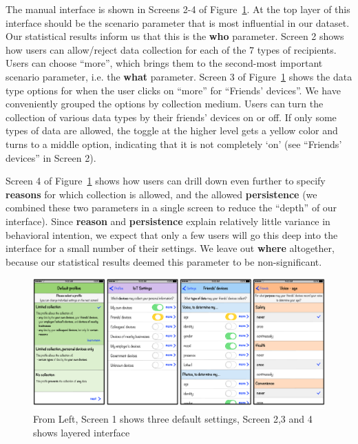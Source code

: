 The manual interface is shown in Screens 2-4 of Figure~\ref{fig:interface1}. At the top layer of this interface should be the scenario parameter that is most influential in our dataset. Our statistical results inform us that this is the \textbf{who} parameter. Screen 2 shows how users can allow/reject data collection for each of the 7 types of recipients. Users can choose ``more'', which brings them to the second-most important scenario parameter, i.e. the \textbf{what} parameter. Screen 3 of Figure~\ref{fig:interface1} shows the data type options for when the user clicks on ``more'' for ``Friends' devices''. We have conveniently grouped the options by collection medium. Users can turn the collection of various data types by their friends' devices on or off. If only some types of data are allowed, the toggle at the higher level gets a yellow color and turns to a middle option, indicating that it is not completely `on' (see ``Friends' devices'' in Screen 2).

Screen 4 of Figure~\ref{fig:interface1} shows how users can drill down even further to specify \textbf{reasons} for which collection is allowed, and the allowed \textbf{persistence} (we combined these two parameters in a single screen to reduce the ``depth'' of our interface). Since \textbf{reason} and \textbf{persistence} explain relatively little variance in behavioral intention, we expect that only a few users will go this deep into the interface for a small number of their settings. We leave out \textbf{where} altogether, because our statistical results deemed this parameter to be non-significant.

\begin{figure}
	\centering
	\includegraphics[width=\textwidth]{figures/interface1.pdf}
	\caption{From Left, Screen 1 shows three default settings, Screen 2,3 and 4 shows layered interface}
	\label{fig:interface1}
\end{figure}

